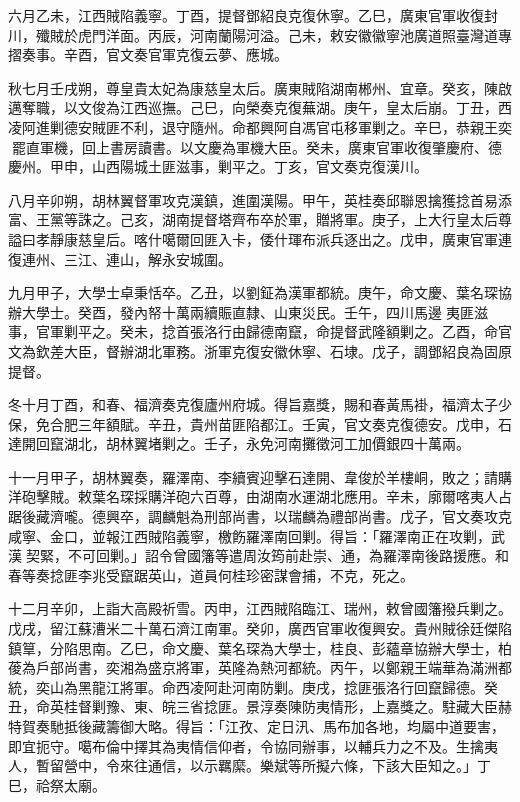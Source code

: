 \begin{pinyinscope}
六月乙未，江西賊陷義寧。丁酉，提督鄧紹良克復休寧。乙巳，廣東官軍收復封川，殲賊於虎門洋面。丙辰，河南蘭陽河溢。己未，敕安徽徽寧池廣道照臺灣道專摺奏事。辛酉，官文奏官軍克復云夢、應城。

秋七月壬戌朔，尊皇貴太妃為康慈皇太后。廣東賊陷湖南郴州、宜章。癸亥，陳啟邁奪職，以文俊為江西巡撫。己巳，向榮奏克復蕪湖。庚午，皇太后崩。丁丑，西凌阿進剿德安賊匪不利，退守隨州。命都興阿自馮官屯移軍剿之。辛巳，恭親王奕罷直軍機，回上書房讀書。以文慶為軍機大臣。癸未，廣東官軍收復肇慶府、德慶州。甲申，山西陽城土匪滋事，剿平之。丁亥，官文奏克復漢川。

八月辛卯朔，胡林翼督軍攻克漢鎮，進圍漢陽。甲午，英桂奏邱聯恩擒獲捻首易添富、王黨等誅之。己亥，湖南提督塔齊布卒於軍，贈將軍。庚子，上大行皇太后尊謚曰孝靜康慈皇后。喀什噶爾回匪入卡，倭什琿布派兵逐出之。戊申，廣東官軍連復連州、三江、連山，解永安城圍。

九月甲子，大學士卓秉恬卒。乙丑，以劉鉦為漢軍都統。庚午，命文慶、葉名琛協辦大學士。癸酉，發內帑十萬兩續賑直隸、山東災民。壬午，四川馬邊夷匪滋事，官軍剿平之。癸未，捻首張洛行由歸德南竄，命提督武隆額剿之。乙酉，命官文為欽差大臣，督辦湖北軍務。浙軍克復安徽休寧、石埭。戊子，調鄧紹良為固原提督。

冬十月丁酉，和春、福濟奏克復廬州府城。得旨嘉獎，賜和春黃馬褂，福濟太子少保，免合肥三年額賦。辛丑，貴州苗匪陷都江。壬寅，官文奏克復德安。戊申，石達開回竄湖北，胡林翼堵剿之。壬子，永免河南攤徵河工加價銀四十萬兩。

十一月甲子，胡林翼奏，羅澤南、李續賓迎擊石達開、韋俊於羊樓峒，敗之；請購洋砲擊賊。敕葉名琛採購洋砲六百尊，由湖南水運湖北應用。辛未，廓爾喀夷人占踞後藏濟嚨。德興卒，調麟魁為刑部尚書，以瑞麟為禮部尚書。戊子，官文奏攻克咸寧、金口，並報江西賊陷義寧，檄飭羅澤南回剿。得旨：「羅澤南正在攻剿，武漢契緊，不可回剿。」詔令曾國籓等遣周汝筠前赴崇、通，為羅澤南後路援應。和春等奏捻匪李兆受竄踞英山，道員何桂珍密謀會捕，不克，死之。

十二月辛卯，上詣大高殿祈雪。丙申，江西賊陷臨江、瑞州，敕曾國籓撥兵剿之。戊戌，留江蘇漕米二十萬石濟江南軍。癸卯，廣西官軍收復興安。貴州賊徐廷傑陷鎮筸，分陷思南。乙巳，命文慶、葉名琛為大學士，桂良、彭蘊章協辦大學士，柏葰為戶部尚書，奕湘為盛京將軍，英隆為熱河都統。丙午，以鄭親王端華為滿洲都統，奕山為黑龍江將軍。命西凌阿赴河南防剿。庚戌，捻匪張洛行回竄歸德。癸丑，命英桂督剿豫、東、皖三省捻匪。景淳奏陳防夷情形，上嘉獎之。駐藏大臣赫特賀奏馳抵後藏籌御大略。得旨：「江孜、定日汛、馬布加各地，均屬中道要害，即宜扼守。噶布倫中擇其為夷情信仰者，令協同辦事，以輔兵力之不及。生擒夷人，暫留營中，令來往通信，以示羈縻。樂斌等所擬六條，下該大臣知之。」丁巳，祫祭太廟。


\end{pinyinscope}
